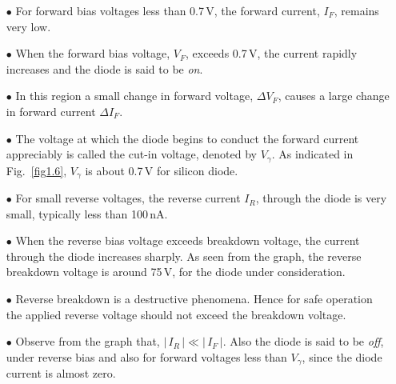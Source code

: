 \begin{itemize}
\itemsep=1pt
\item[$\bullet$] For forward bias voltages less than 0.7\,V, the forward current, $I_{F}$, remains very low.

\item[$\bullet$] When the forward bias voltage, $V_{F}$, exceeds 0.7\,V, the current rapidly increases and the diode is said to be {\em on}.

\item[$\bullet$] In this region a small change in forward voltage, $\Delta V_{F}$, causes a large change in forward current $\Delta I_{F}$.

\item[$\bullet$] The voltage at which the diode begins to conduct the forward current appreciably is called the cut-in voltage, denoted by $V_{\gamma}$. As indicated in Fig.~\ref{fig1.6}, $V_{\gamma}$ is about 0.7\,V for silicon diode.\\[-18pt]
\end{itemize}

\begin{itemize}
\itemsep=1pt
\item[$\bullet$] For small reverse voltages, the reverse current $I_{R}$, through the diode is very small, typically less than 100\,nA.

\item[$\bullet$] When the reverse bias voltage exceeds breakdown voltage, the current through the diode increases sharply. As seen from the graph, the reverse breakdown voltage is around 75\,V, for the diode under consideration. 

\item[$\bullet$] Reverse breakdown is a destructive phenomena. Hence for safe operation the applied reverse voltage should not exceed the breakdown voltage.

\item[$\bullet$] Observe from the graph that, $|\,I_{R}\,|\ll |\,I_{F}\,|$. Also the diode is said to be {\em off}, under reverse bias and also for forward voltages less than $V_{\gamma}$, since the diode current is almost zero.
\end{itemize}

